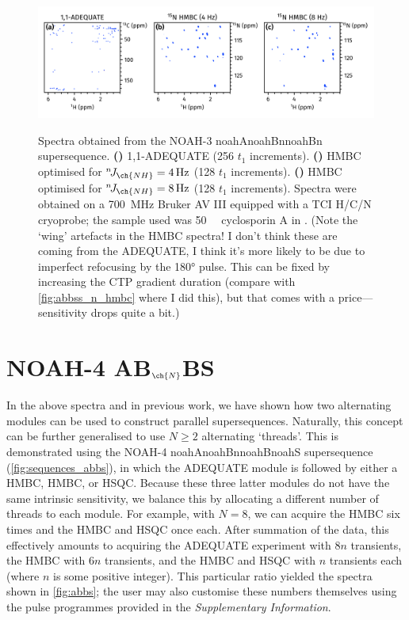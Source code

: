 \documentclass[a4paper,12pt]{article}
\newcommand{\proton}{\ch{^{1}H}}
\newcommand{\carbon}{\ch{^{13}C}}
\newcommand{\nitrogen}{\ch{^{15}N}}
\newcommand{\SInf}{\textit{Supplementary Information}}
\newcommand{\todo}[1]{{\color{OrangeRed}#1}}
\newcommand{\njnh}{{}^n\!J_{\ch{NH}}}
\newcommand*{\cyclo}{Spectra were obtained on a \SI{700}{\MHz} Bruker AV III equipped with a TCI H/C/N cryoprobe; the sample used was \SI{50}{\milli\molar} cyclosporin A in \ch{C6D6}.}
\newcommand*{\noahthree}[3]{\csname noah#1\endcsname\csname noah#2\endcsname\csname noah#3\endcsname}
\newcommand*{\noahfour}[4]{\csname noah#1\endcsname\csname noah#2\endcsname\csname noah#3\endcsname\csname noah#4\endcsname}
\begin{document}
\begin{refsection}
\begin{figure}[ht]
    \centering
    \includegraphics[width=\textwidth]{abb.png}
    {\label{fig:abb_adeq}}
    {\label{fig:abb_n_hmbc1}}
    {\label{fig:abb_n_hmbc2}}
    \caption{
        Spectra obtained from the NOAH-3 \noahthree{A}{Bn}{Bn} supersequence.
        \textbf{()} 1,1-ADEQUATE (256 $t_1$ increments).
        \textbf{()} \nitrogen{} HMBC optimised for $\njnh = \SI{4}{Hz}$ (128 $t_1$ increments).
        \textbf{()} \nitrogen{} HMBC optimised for $\njnh = \SI{8}{Hz}$ (128 $t_1$ increments).
        \cyclo{}
        \todo{(Note the `wing' artefacts in the HMBC spectra! I don't think these are coming from the ADEQUATE, I think it's more likely to be due to imperfect refocusing by the \proton{} \ang{180} pulse. This can be fixed by increasing the CTP gradient duration (compare with \cref{fig:abbss_n_hmbc} where I did this), but that comes with a price---sensitivity drops quite a bit.)}
    }
    \label{fig:abb}
\end{figure}

\section{NOAH-4 AB\texorpdfstring{$_{\ch{N}}$}{n}BS}

In the above spectra and in previous work,\autocite{Kupce2021JACSA} we have shown how two alternating modules can be used to construct parallel supersequences.
Naturally, this concept can be further generalised to use $N \geq 2$ alternating `threads'.
This is demonstrated using the NOAH-4 \noahfour{A}{Bn}{B}{S} supersequence (\cref{fig:sequences_abbs}), in which the ADEQUATE module is followed by either a \nitrogen{} HMBC, \carbon{} HMBC, or \carbon{} HSQC.
Because these three latter modules do not have the same intrinsic sensitivity, we balance this by allocating a different number of threads to each module.
For example, with $N = 8$, we can acquire the \nitrogen{} HMBC six times and the \carbon{} HMBC and HSQC once each.
After summation of the data, this effectively amounts to acquiring the ADEQUATE experiment with $8n$ transients, the \nitrogen{} HMBC with $6n$ transients, and the \carbon{} HMBC and HSQC with $n$ transients each (where $n$ is some positive integer).
This particular ratio yielded the spectra shown in \cref{fig:abbs}; the user may also customise these numbers themselves using the pulse programmes provided in the \SInf{}.


\end{refsection}
\end{document}
